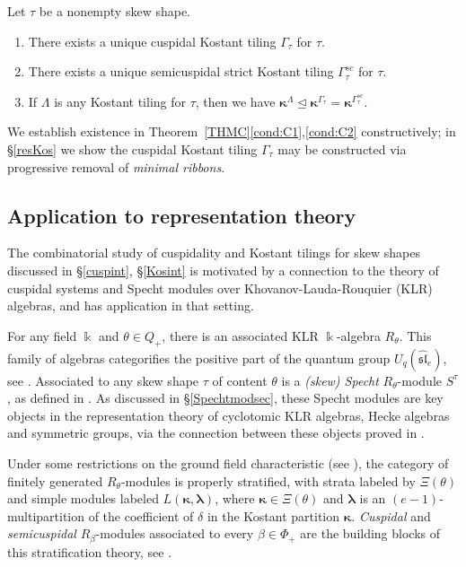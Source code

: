 \documentclass[Unicode,ALCO]{cedram}
\newcommand{\0}{{\bar 0}}
\newcommand{\blam}{\boldsymbol{\lambda}}
\newcommand{\bkap}{\boldsymbol{\kappa}}
\def\k{\Bbbk}
\begin{document}
\begin{introtheorem}\label{THMC}
Let \(\tau\) be a nonempty skew shape.
\begin{enumerate}
\item There exists a unique cuspidal Kostant tiling \(\Gamma_\tau\) for \(\tau\). \label{cond:C1}
\item There exists a unique semicuspidal strict Kostant tiling \(\Gamma^{sc}_\tau\) for \(\tau\). \label{cond:C2}
\item If \(\Lambda\) is any Kostant tiling for \(\tau\), then we have \( \bkap^{\Lambda} \trianglelefteq \bkap^{\Gamma_\tau} = \bkap^{\Gamma^{sc}_\tau} \). \label{cond:C3}
\end{enumerate}
\end{introtheorem}

We establish existence in Theorem~\ref{THMC}\eqref{cond:C1},\eqref{cond:C2} constructively;
in \S\ref{resKos} we show the cuspidal Kostant tiling \(\Gamma_\tau\) may be constructed via progressive removal of {\em minimal ribbons}.

\subsection{Application to representation theory} 

The combinatorial study of cuspidality and Kostant tilings for skew shapes discussed in \S\ref{cuspint}, \S\ref{Kosint} is motivated by a connection to the theory of cuspidal systems and Specht modules over Khovanov-Lauda-Rouquier (KLR) algebras, and has application in that setting.

For any field \(\k\) and \(\theta \in Q_+\), there is an associated KLR \(\k\)-algebra \(R_\theta\). This family of algebras categorifies the positive part of the quantum group \(U_q(\widehat{\mathfrak{sl}}_e)\), see \cite{KhoLauDiagCat1, KhoLauDiagCat2, Rouq2KM}. Associated to any skew shape \(\tau\) of content \(\theta\) is a {\em (skew) Specht} \(R_\theta\)-module \(S^\tau\), as defined in \cite{KMRUnivSpecht, MuSkew}. As discussed in \S\ref{Spechtmodsec}, these Specht modules are key objects in the representation theory of cyclotomic KLR algebras, Hecke algebras and symmetric groups, via the connection between these objects proved in \cite{BrKlBloCyc}.

Under some restrictions on the ground field characteristic (see \cite{KlMuStrat}), the category of finitely generated \(R_\theta\)-modules is properly stratified, with strata labeled by \(\Xi(\theta)\) and simple modules labeled \(L(\bkap, \blam)\), where \(\bkap \in \Xi(\theta)\) and \(\blam\) is an \((e-1)\)-multipartition of the coefficient of \(\delta\) in the Kostant partition \(\bkap\). {\em Cuspidal} and {\em semicuspidal} \(R_\beta\)-modules associated to every \(\beta \in \Phi_+\) are the building blocks of this stratification theory, see \cite{KlCuspSys, McNRepKLR3, KlMuStrat}.
\end{document}
